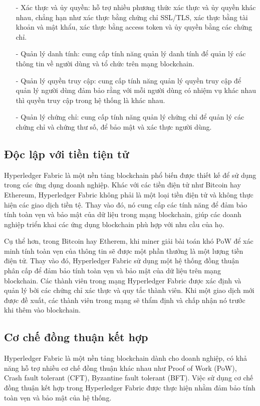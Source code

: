 \begin{itemize}
    \item[-] Xác thực và ủy quyền: hỗ trợ nhiều phương thức xác thực và ủy quyền khác nhau, 
    chẳng hạn như xác thực bằng chứng chỉ SSL/TLS, xác thực bằng tài khoản và mật khẩu, 
    xác thực bằng access token và ủy quyền bằng các chứng chỉ.
    \item[-] Quản lý danh tính: cung cấp tính năng quản lý danh tính để quản lý các thông tin
    về người dùng và tổ chức trên mạng blockchain.
    \item[-] Quản lý quyền truy cập: cung cấp tính năng quản lý quyền truy cập để quản lý 
    người dùng đảm bảo rằng với mỗi người dùng có nhiệm vụ khác nhau thì quyền truy cập trong
    hệ thống là khác nhau.
    \item[-] Quản lý chứng chỉ: cung cấp tính năng quản lý chứng chỉ để quản lý các chứng chỉ
    và chứng thư số, để bảo mật và xác thực người dùng. \cite{hyperledger}

\end{itemize}
\subsection{Độc lập với tiền tiện tử}

Hyperledger Fabric là một nền tảng blockchain phổ biến được thiết kế để sử dụng trong các 
ứng dụng doanh nghiệp. Khác với các tiền điện tử như Bitcoin hay Ethereum, Hyperledger 
Fabric không phải là một loại tiền điện tử và không thực hiện các giao dịch tiền tệ. Thay 
vào đó, nó cung cấp các tính năng để đảm bảo tính toàn vẹn và bảo mật của dữ liệu trong 
mạng blockchain, giúp các doanh nghiệp triển khai các ứng dụng blockchain phù hợp với nhu 
cầu của họ.

Cụ thể hơn, trong Bitcoin hay Etherem, khi miner giải bài toán khó PoW để xác minh tính
toàn vẹn của thông tin sẽ được một phần thưởng là một lượng tiền điện tử. Thay vào đó, Hyperledger Fabric
sử dụng một hệ thống đồng thuận phân cấp để đảm bảo tính toàn vẹn và bảo mật của dữ liệu 
trên mạng blockchain. Các thành viên trong mạng Hyperledger Fabric được xác định và quản 
lý bởi các chứng chỉ xác thực và quy tắc thành viên. Khi một giao dịch mới được đề xuất, 
các thành viên trong mạng sẽ thẩm định và chấp nhận nó trước khi thêm vào blockchain.

\subsection{Cơ chế đồng thuận kết hợp}
Hyperledger Fabric là một nền tảng blockchain dành cho doanh nghiệp, có khả năng hỗ trợ 
nhiều cơ chế đồng thuận khác nhau như Proof of Work (PoW), Crash fault tolerant (CFT), Byzantine fault tolerant (BFT). Việc sử dụng cơ chế đồng thuận kết hợp trong 
Hyperledger Fabric được thực hiện nhằm đảm bảo tính toàn vẹn và bảo mật của hệ thống. 

